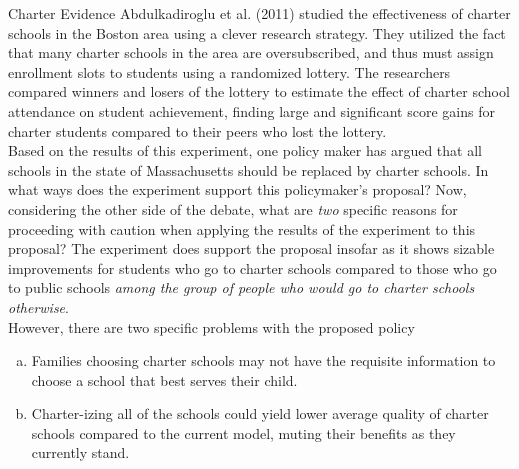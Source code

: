 \documentclass[10pt]{extarticle}
\title{}
\author{Avinash Iyer}
\date{}
\begin{document}
  \begin{problem}{Charter Evidence}
    Abdulkadiroglu et al. (2011) studied the effectiveness of charter schools in the Boston area using a clever research strategy. They utilized the fact that many charter schools in the area are oversubscribed, and thus must assign enrollment slots to students using a randomized lottery. The researchers compared winners and losers of the lottery to estimate the effect of charter school attendance on student achievement, finding large and significant score gains for charter students compared to their peers who lost the lottery.\\

    Based on the results of this experiment, one policy maker has argued that all schools in the state of Massachusetts should be replaced by charter schools. In what ways does the experiment support this policymaker's proposal? Now, considering the other side of the debate, what are \textit{two} specific reasons for proceeding with caution when applying the results of the experiment to this proposal?
    \tcblower
    The experiment does support the proposal insofar as it shows sizable improvements for students who go to charter schools compared to those who go to public schools \textit{among the group of people who would go to charter schools otherwise}.\\

    However, there are two specific problems with the proposed policy
    \begin{enumerate}[(a)]
      \item Families choosing charter schools may not have the requisite information to choose a school that best serves their child.
      \item Charter-izing all of the schools could yield lower average quality of charter schools compared to the current model, muting their benefits as they currently stand.
    \end{enumerate}
  \end{problem}
\end{document}

